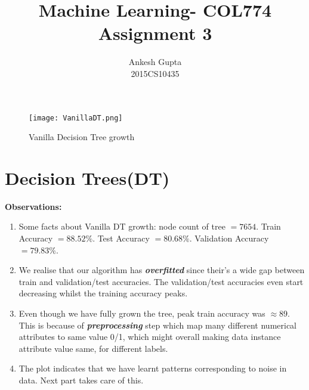 \documentclass{article}
\newcommand{\bld}[1]{\textbf{#1}}
\newcommand{\italb}[1]{\textbf{\textit{#1}}}
\begin{document}
\title{Machine Learning- COL774 \\Assignment 3}
\author{Ankesh Gupta\\2015CS10435}

\date{}
\maketitle


\begin{figure}[h]
\vspace*{-1.3cm}
\hspace*{-2cm}
\centering
\texttt{[image: VanillaDT.png]}
\vspace*{-1.5cm}
\caption{Vanilla Decision Tree growth}
\vspace*{-0.5cm}
\end{figure}

\section*{Decision Trees(DT)}
\bld{Observations:}
\begin{enumerate}
	\item Some facts about Vanilla DT growth: node count of tree $= 7654$. Train Accuracy $=88.52\%$. Test Accuracy $=80.68\%$. Validation Accuracy $=79.83\%$.
	\item We realise that our algorithm has \italb{overfitted} since their's a wide gap between train and validation/test accuracies. The validation/test accuracies even start decreasing whilst the training accuracy peaks.
	\item Even though we have fully grown the tree, peak train accuracy was $\approx 89$. This is because of \italb{preprocessing} step which map many different numerical attributes to same value 0/1, which might overall making data instance attribute value same, for different labels. 
	\item The plot indicates that we have learnt patterns corresponding to noise in data. Next part takes care of this.
\end{enumerate}
\end{document}
